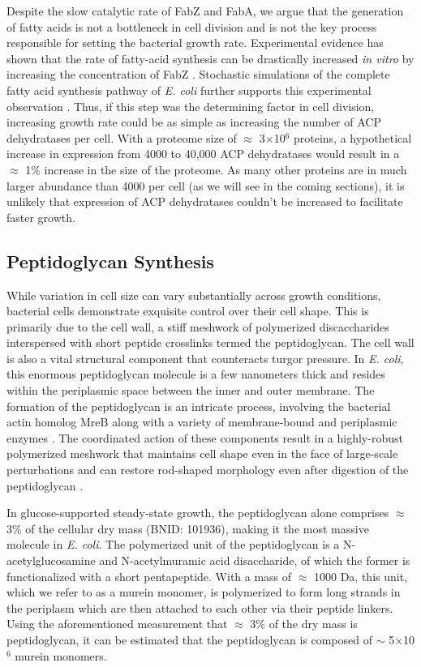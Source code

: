 Despite the slow catalytic rate of FabZ and FabA, we argue that the generation
of fatty acids is not a bottleneck in cell division and is not the key process
responsible for setting the bacterial growth rate. Experimental evidence has
shown that the rate of fatty-acid synthesis can be drastically increased
\textit{in vitro} by increasing the concentration of FabZ \cite{yu2011}.
Stochastic simulations of the complete fatty acid synthesis pathway of
\textit{E. coli} further supports this experimental observation
\cite{ruppe2018}. Thus, if this step was the determining factor in cell
division, increasing growth rate could be as simple as increasing the number of
ACP dehydratases per cell. With a proteome size of $\approx$ 3$\times$10$^6$
proteins, a hypothetical increase in expression from 4000 to 40,000 ACP
dehydratases would result in a $\approx$ 1\% increase in the size of the proteome. As
many other  proteins are in much larger abundance than 4000 per cell (as we will
see in the coming sections), it is unlikely that expression of ACP dehydratases
couldn't be increased to facilitate faster growth.


\subsection{Peptidoglycan Synthesis}
While variation in cell size can vary substantially across growth conditions,
bacterial cells demonstrate exquisite control over their cell shape. This is
primarily due to the cell wall, a stiff meshwork of polymerized discaccharides
interspersed with short peptide crosslinks termed the peptidoglycan. The cell
wall is also a vital structural component that counteracts turgor pressure. In
\textit{E. coli}, this enormous peptidoglycan molecule is a few nanometers thick
and resides within the periplasmic space between the inner and outer membrane.
The formation of the peptidoglycan is an intricate process, involving the
bacterial actin homolog MreB \citep{shi2018} along with a variety of
membrane-bound and periplasmic enzymes \citep{morgenstein2015}. The coordinated
action of these components result in a highly-robust polymerized meshwork that
maintains cell shape even in the face of large-scale perturbations and can
restore rod-shaped morphology even after digestion of the peptidoglycan
\citep{harris2018,shi2018}.

In glucose-supported steady-state growth, the peptidoglycan alone comprises
$\approx$ 3\% of the cellular dry mass (BNID: 101936), making
it the most massive molecule in \textit{E. coli}. The polymerized unit of the
peptidoglycan is a N-acetylglucosamine and N-acetylmuramic acid disaccharide,
of which the former  is functionalized with a short pentapeptide. With a mass of
$\approx$ 1000 Da, this unit, which we refer to as a murein monomer, is
polymerized to form long strands in the periplasm which are then attached to
each other via their peptide linkers. Using the aforementioned measurement that
$\approx$ 3\% of the dry mass is peptidoglycan, it can be estimated that the
peptidoglycan is composed of $\sim$ 5$\times$10$^6$ murein monomers.


